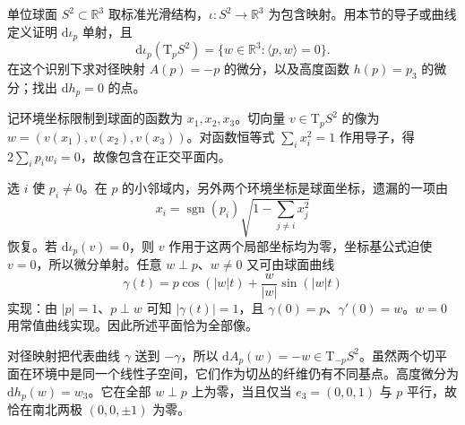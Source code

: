 \begin{exercise}
	\label{g1:ex:sphere-derivation-tangent}
	单位球面 \(S^2\subset\mathbb R^3\) 取标准光滑结构，\(\iota:S^2\to\mathbb R^3\) 为包含映射。用本节的导子或曲线定义证明 \(\mathrm{d}\iota_p\) 单射，且
	\[
		\mathrm{d}\iota_p(\mathrm{T}_pS^2)=\{w\in\mathbb R^3:\langle p,w\rangle=0\}.
	\]
	在这个识别下求对径映射 \(A(p)=-p\) 的微分，以及高度函数 \(h(p)=p_3\) 的微分；找出 \(\mathrm{d}h_p=0\) 的点。
\end{exercise}
\begin{solution}
	记环境坐标限制到球面的函数为 \(x_1,x_2,x_3\)。切向量 \(v\in \mathrm{T}_pS^2\) 的像为 \(w=(v(x_1),v(x_2),v(x_3))\)。对函数恒等式 \(\sum_i x_i^2=1\) 作用导子，得 \(2\sum_i p_iw_i=0\)，故像包含在正交平面内。

	选 \(i\) 使 \(p_i\ne0\)。在 \(p\) 的小邻域内，另外两个环境坐标是球面坐标，遗漏的一项由
	\[
		x_i=\operatorname{sgn}(p_i)\sqrt{1-\sum_{j\ne i}x_j^2}
	\]
	恢复。若 \(\mathrm{d}\iota_p(v)=0\)，则 \(v\) 作用于这两个局部坐标均为零，坐标基公式迫使 \(v=0\)，所以微分单射。任意 \(w\perp p\)、\(w\ne0\) 又可由球面曲线
	\[
		\gamma(t)=p\cos(|w|t)+\frac{w}{|w|}\sin(|w|t)
	\]
	实现：由 \(|p|=1\)、\(p\perp w\) 可知 \(|\gamma(t)|=1\)，且 \(\gamma(0)=p\)、\(\gamma'(0)=w\)。\(w=0\) 用常值曲线实现。因此所述平面恰为全部像。

	对径映射把代表曲线 \(\gamma\) 送到 \(-\gamma\)，所以 \(\mathrm{d}A_p(w)=-w\in \mathrm{T}_{-p}S^2\)。虽然两个切平面在环境中是同一个线性子空间，它们作为切丛的纤维仍有不同基点。高度微分为 \(\mathrm{d}h_p(w)=w_3\)。它在全部 \(w\perp p\) 上为零，当且仅当 \(e_3=(0,0,1)\) 与 \(p\) 平行，故恰在南北两极 \((0,0,\pm1)\) 为零。
\end{solution}

